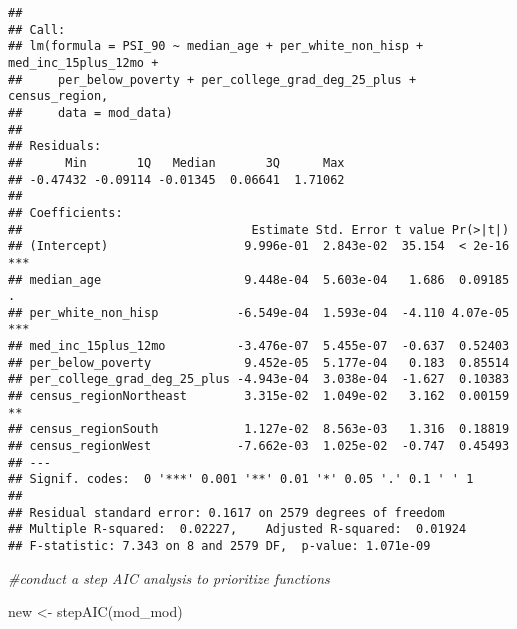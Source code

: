 \documentclass[
]{article}
\newenvironment{Shaded}{\begin{snugshade}}{\end{snugshade}}
\newcommand{\CommentTok}[1]{\textcolor[rgb]{0.56,0.35,0.01}{\textit{#1}}}
\newcommand{\FunctionTok}[1]{\textcolor[rgb]{0.00,0.00,0.00}{#1}}
\newcommand{\NormalTok}[1]{#1}
\newcommand{\OtherTok}[1]{\textcolor[rgb]{0.56,0.35,0.01}{#1}}
\begin{document}
\begin{verbatim}
## 
## Call:
## lm(formula = PSI_90 ~ median_age + per_white_non_hisp + med_inc_15plus_12mo + 
##     per_below_poverty + per_college_grad_deg_25_plus + census_region, 
##     data = mod_data)
## 
## Residuals:
##      Min       1Q   Median       3Q      Max 
## -0.47432 -0.09114 -0.01345  0.06641  1.71062 
## 
## Coefficients:
##                                Estimate Std. Error t value Pr(>|t|)    
## (Intercept)                   9.996e-01  2.843e-02  35.154  < 2e-16 ***
## median_age                    9.448e-04  5.603e-04   1.686  0.09185 .  
## per_white_non_hisp           -6.549e-04  1.593e-04  -4.110 4.07e-05 ***
## med_inc_15plus_12mo          -3.476e-07  5.455e-07  -0.637  0.52403    
## per_below_poverty             9.452e-05  5.177e-04   0.183  0.85514    
## per_college_grad_deg_25_plus -4.943e-04  3.038e-04  -1.627  0.10383    
## census_regionNortheast        3.315e-02  1.049e-02   3.162  0.00159 ** 
## census_regionSouth            1.127e-02  8.563e-03   1.316  0.18819    
## census_regionWest            -7.662e-03  1.025e-02  -0.747  0.45493    
## ---
## Signif. codes:  0 '***' 0.001 '**' 0.01 '*' 0.05 '.' 0.1 ' ' 1
## 
## Residual standard error: 0.1617 on 2579 degrees of freedom
## Multiple R-squared:  0.02227,    Adjusted R-squared:  0.01924 
## F-statistic: 7.343 on 8 and 2579 DF,  p-value: 1.071e-09
\end{verbatim}

\begin{Shaded}
\begin{Highlighting}[]
\CommentTok{\#conduct a step AIC analysis to prioritize functions}

\NormalTok{new }\OtherTok{\textless{}{-}} \FunctionTok{stepAIC}\NormalTok{(mod\_mod)}
\end{Highlighting}
\end{Shaded}
\end{document}
